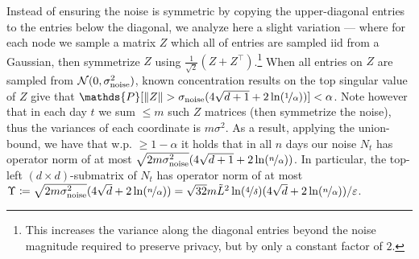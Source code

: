 \documentclass{article}
\newcommand{\defeq}{\coloneq}
\renewcommand{\Pr}{\mathds{P}}
\providecommand\transp{\top}
\let\transpsymbol\transp
\renewcommand{\transp}[1]{#1^\transpsymbol}
\newcommand{\Normal}{\mathcal{N}}
\begin{document}
Instead of ensuring the noise is symmetric by copying the upper-diagonal entries to the entries below the diagonal, we analyze here a slight variation --- where for each node we sample a matrix $Z$ which all of entries are sampled iid from a Gaussian, then symmetrize $Z$ using $\tfrac 1 {\sqrt 2}(Z+\transp{Z})$.\footnote{This increases the variance along the diagonal entries beyond the noise magnitude required to preserve privacy, but by only a constant factor of $2$.} When all entries on $Z$ are sampled from $\Normal(0,\sigma_{\rm noise}^2)$, known concentration results on the top singular value of $Z$ give that $\Pr[ \|Z\| > \sigma_{\rm noise}(4\sqrt{d+1} + 2\ln(\nicefrac 1 \alpha)) ] < \alpha$. Note however that in each day $t$ we sum $\leq m$ such $Z$ matrices (then symmetrize the noise), thus the variances of each coordinate is $m\sigma^2$. As a result, applying the union-bound, we have that w.p. $\geq 1-\alpha$ it holds that in all $n$ days our noise $N_t$ has operator norm of at most $\sqrt{2m\sigma_{\rm noise}^2}(4\sqrt{d+1} + 2\ln(\nicefrac n \alpha))$. In particular, the top-left $(d\times d)$-submatrix of $N_t$ has operator norm of at most $\Upsilon \defeq \sqrt{2m\sigma_{\rm noise}^2}(4\sqrt{d} + 2\ln(\nicefrac n \alpha)) = \sqrt{32} m\tilde L ^2 \ln(\nicefrac 4 \delta)(4\sqrt{d} + 2\ln(\nicefrac n \alpha)) / \varepsilon$.
\end{document}
